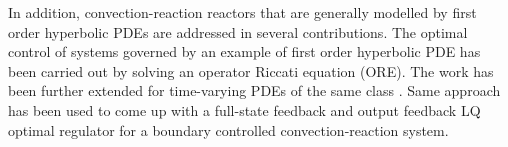 In addition, convection-reaction reactors that are generally modelled by first order hyperbolic PDEs are addressed in several contributions.
The optimal control of systems governed by an example of first order hyperbolic PDE has been carried out by solving an operator Riccati equation (ORE)\autocite{aksikas2009lq}. The work has been further extended for time-varying PDEs of the same class \autocite{aksikas2013optimal}. Same approach has been used to come up with a full-state feedback \autocite{mohammadi2012lq} and output feedback \autocite{aksikas2024spectral} LQ optimal regulator for a boundary controlled convection-reaction system.



